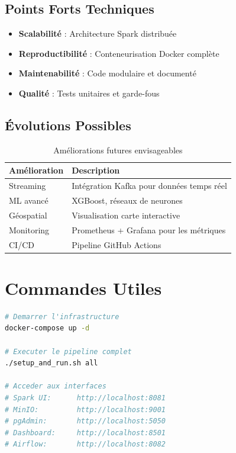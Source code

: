 \documentclass[12pt,a4paper]{report}
\begin{document}
\section{Points Forts Techniques}

\begin{itemize}
    \item \textbf{Scalabilité} : Architecture Spark distribuée
    \item \textbf{Reproductibilité} : Conteneurisation Docker complète
    \item \textbf{Maintenabilité} : Code modulaire et documenté
    \item \textbf{Qualité} : Tests unitaires et garde-fous
\end{itemize}

\section{Évolutions Possibles}

\begin{table}[H]
\centering
\caption{Améliorations futures envisageables}
\begin{tabular}{@{}lp{8cm}@{}}
\toprule
\textbf{Amélioration} & \textbf{Description} \\
\midrule
Streaming & Intégration Kafka pour données temps réel \\
ML avancé & XGBoost, réseaux de neurones \\
Géospatial & Visualisation carte interactive \\
Monitoring & Prometheus + Grafana pour les métriques \\
CI/CD & Pipeline GitHub Actions \\
\bottomrule
\end{tabular}
\end{table}

\appendix

\chapter{Commandes Utiles}

\begin{lstlisting}[language=bash, caption=Commandes principales]
# Demarrer l'infrastructure
docker-compose up -d

# Executer le pipeline complet
./setup_and_run.sh all

# Acceder aux interfaces
# Spark UI:      http://localhost:8081
# MinIO:         http://localhost:9001
# pgAdmin:       http://localhost:5050
# Dashboard:     http://localhost:8501
# Airflow:       http://localhost:8082
\end{lstlisting}
\end{document}
